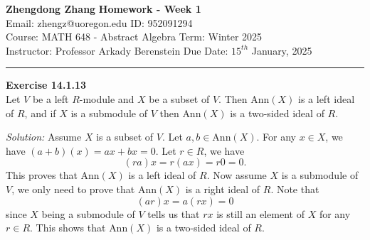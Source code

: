 \documentclass[a4paper, 12pt]{article}
\newenvironment{problem}[2][Exercise]
    { \begin{mdframed}[backgroundcolor=gray!20] \textbf{#1 #2} \\}
    {  \end{mdframed}}
\newenvironment{solution}
    {\textit{Solution:}}
    {}
\newcommand{\Ann}{\text{Ann}}
\begin{document}
\noindent
\large\textbf{Zhengdong Zhang} \hfill \textbf{Homework - Week 1}   \\
Email: zhengz@uoregon.edu \hfill ID: 952091294 \\
\normalsize Course: MATH 648 - Abstract Algebra  \hfill Term: Winter 2025\\
Instructor: Professor Arkady Berenstein \hfill Due Date: $15^{th}$ January, 2025 \\
\noindent\rule{7in}{2.8pt}
\begin{problem}{14.1.13}
Let \(V\) be a left \(R\)-module and \(X\) be a subset of \(V\). Then \(\Ann(X)\) is a left ideal of \(R\), and if \(X\) is a submodule of \(V\) then \(\Ann(X)\) is a two-sided ideal of \(R\).
\end{problem}
\begin{solution}
Assume \(X\) is a subset of \(V\). Let \(a,b\in \Ann(X)\). For any \(x\in X\), we have \((a+b)(x)=ax+bx=0\). Let \(r\in R\), we have 
\[(ra)x=r(ax)=r0=0.\]
This proves that \(\Ann(X)\) is a left ideal of \(R\). Now assume \(X\) is a submodule of \(V\), we only need to prove that \(\Ann(X)\) is a right ideal of \(R\). Note that 
\[(ar)x=a(rx)=0\]
since \(X\) being a submodule of \(V\) tells us that \(rx\) is still an element of \(X\) for any \(r\in R\). This shows that \(\Ann(X)\) is a two-sided ideal of \(R\).   
\end{solution}
\end{document}
